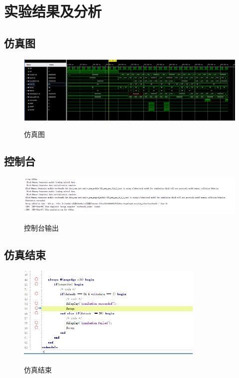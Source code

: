 \section{实验结果及分析}
\subsection{仿真图}
\begin{figure}[H]
    \centering
    \caption{仿真图}
    \includegraphics[width=1\textwidth]{figure/仿真.png}
    \label{fig:sim}
\end{figure}
\subsection{控制台}
\begin{figure}[H]
    \centering
    \caption{控制台输出}
    \includegraphics[width=1\textwidth]{figure/控制台.png}
    \label{fig:console}
\end{figure}
\subsection{仿真结束}
\begin{figure}[H]
    \centering
    \caption{仿真结束}
    \includegraphics[width=0.8\textwidth]{figure/仿真结束.png}
    \label{fig:sim_stop}
\end{figure}